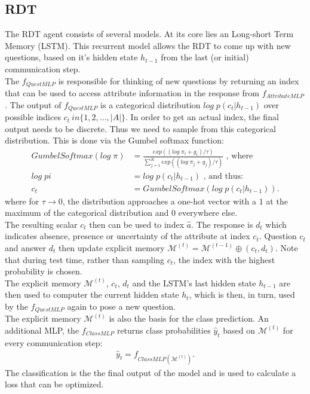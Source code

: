 \documentclass[a4paper,cleardoubleempty,BCOR1cm, 11pt]{report}
\begin{document}
\subsection{RDT}
The RDT agent consists of several models. At its core lies an Long-short Term Memory (LSTM). This recurrent model allows the RDT to come up with new questions, based on it's hidden state $h_{t-1}$ from the last (or initial) communication step.\\
The $f_{QuestMLP}$ is responsible for thinking of new questions by returning an index that can be used to access attribute information in the response from $f_{AttributeMLP}$. The output of $f_{QuestMLP}$ is a categorical distribution $log\;p(c_t|h_{t-1})$ over possible indices $c_t \ in \lbrace 1,2,...,|A| \rbrace$. In order to get an actual index, the final output needs to be discrete. Thus we need to sample from this categorical distribution. This is done via the Gumbel softmax function:
\begin{align}
		GumbelSoftmax(log\;\pi) &= \frac{exp((log\;\pi_i + g_i)/\tau)}{\sum_{j=1}^{K}exp((log\;\pi_j + g_j)/\tau)}\text{ , where}\\
			log\;pi &=log\;p(c_t|h_{t-1})\text{ , and thus:}\\
			c_t &= GumbelSoftmax(log\;p(c_t|h_{t-1})).
\end{align}
where for $\tau \rightarrow 0$, the distribution approaches a one-hot vector with a $1$ at the maximum of the categorical distribution and $0$ everywhere else.\\ 
The resulting scalar $c_t$ then can be used to index $\hat{a}$. The response is $d_t$ which indicates absence, presence or uncertainty of the attribute at index $c_t$. Question $c_t$ and answer $d_t$ then update explicit memory $\mathcal{M}^{(t)} = \mathcal{M}^{(t-1)} \oplus (c_t, d_t)$. Note that during test time, rather than sampling $c_t$, the index with the highest probability is chosen.\\
The explicit memory $\mathcal{M}^{(t)}$, $c_t$, $d_t$ and the LSTM's last hidden state $h_{t-1}$ are then used to computer the current hidden state $h_t$, which is then, in turn, used by the $f_{QuestMLP}$ again to pose a new question.\\
The explicit memory $\mathcal{M}^{(t)}$ is also the basis for the class prediction. An additional MLP, the $f_{ClassMLP}$ returns class probabilities $\hat{y}_t$ based on  $\mathcal{M}^{(t)}$ for every communication step:
\begin{align}
	\hat{y}_t = f_{ClassMLP( \mathcal{M}^{(t)})}.
\end{align} The classification is the the final output of the model and is used to calculate a loss that can be optimized.
\end{document}
